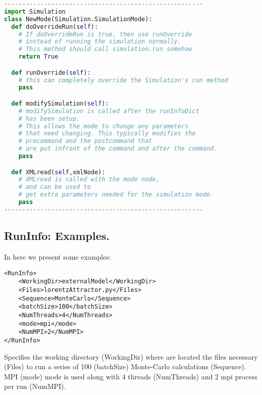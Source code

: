 \begin{lstlisting}[language=python]
-------------------------------------------------------
import Simulation
class NewMode(Simulation.SimulationMode):
  def doOverrideRun(self):
    # If doOverrideRun is true, then use runOverride 
    # instead of running the simulation normally.  
    # This method should call simulation.run somehow 
    return True

  def runOverride(self):
    # this can completely override the Simulation's run method
    pass

  def modifySimulation(self):
    # modifySimulation is called after the runInfoDict 
    # has been setup.
    # This allows the mode to change any parameters 
    # that need changing. This typically modifies the 
    # precommand and the postcommand that
    # are put infront of the command and after the command.
    pass

  def XMLread(self,xmlNode):
    # XMLread is called with the mode node, 
    # and can be used to
    # get extra parameters needed for the simulation mode.
    pass
-------------------------------------------------------
\end{lstlisting}
\subsection{RunInfo: Examples.}
\label{subsec:runinfoexamples}
In here we present some examples:
\begin{lstlisting}[style=XML]
<RunInfo>
    <WorkingDir>externalModel</WorkingDir>
    <Files>lorentzAttractor.py</Files>
    <Sequence>MonteCarlo</Sequence>
    <batchSize>100</batchSize>
    <NumThreads>4</NumThreads>    
    <mode>mpi</mode>
    <NumMPI>2</NumMPI>
</RunInfo>
\end{lstlisting}
Specifies the working directory (WorkingDir) where are located the files necessary (Files) to run a series of 100 (batchSize) Monte-Carlo calculations (Sequence).
MPI (mode) mode is used along with 4 threads (NumThreads) and 2 mpi process per run (NumMPI).
